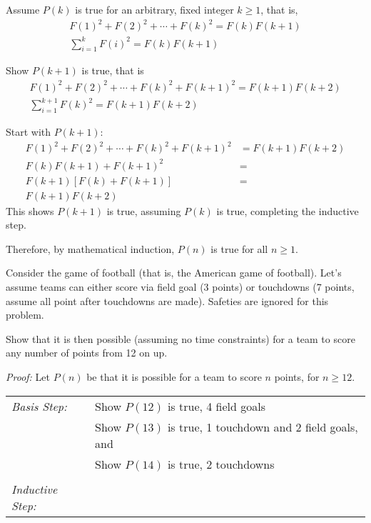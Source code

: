 \begin{questions}
\begin{solution}
  Assume $P(k)$ is true for an arbitrary, fixed integer $k \geq 1$, that is,
  \begin{align*}
    F(1)^2 + F(2)^2 + \cdots + F(k)^2  = F(k)F(k+1)  \tag{IH} \\
    \sum_{i=1}^k F(i)^2 = F(k)F(k+1)
  \end{align*}

  Show $P(k+1)$ is true, that is
  \begin{align*}
    F(1)^2 + F(2)^2 + \cdots + F(k)^2 + F(k+1)^2 = F(k+1)F(k+2) \\
    \sum_{i=1}^{k+1} F(k)^2 = F(k+1)F(k+2) 
  \end{align*}

  Start with $P(k+1)$:
  \begin{align*}
    F(1)^2 + F(2)^2 + \cdots + F(k)^2 + F(k+1)^2 &= F(k+1)F(k+2) \\
    F(k)F(k+1) + F(k+1)^2 &= \tag{IH} \\
    F(k+1)\left[ F(k) + F(k+1) \right] &= \\
    F(k+1)F(k+2) 
  \end{align*}
  This shows $P(k+1)$ is true, assuming $P(k)$ is true, completing the inductive step. 

  Therefore, by mathematical induction, $P(n)$ is true for all $n \geq 1$.
\end{solution}



 Consider the game of football (that is, the American game of football).  Let's assume teams can either score via field goal (3 points) or touchdowns (7 points, assume all point after touchdowns are made).   Safeties are ignored for this problem.  

Show that it is then possible (assuming no time constraints) for a team to score any number of points from 12 on up. 
    \ifprintanswers
        \vspace{-10pt}
   \fi
\begin{solution}
    \textit{Proof:}
    Let $P(n)$ be that it is possible for a team to score $n$ points, for $n \geq 12$.
    
    \smallskip
    \begin{tabular}{lp{4in}}
      \textit{Basis Step:}  & Show $P(12)$ is true, 4 field goals \\
                            & Show $P(13)$ is true, 1 touchdown and 2 field goals, and \\
                            & Show $P(14)$ is true, 2 touchdowns \\
       & \\
     \textit{Inductive Step:} &  \\
    \end{tabular}


\end{solution}
\end{questions}
